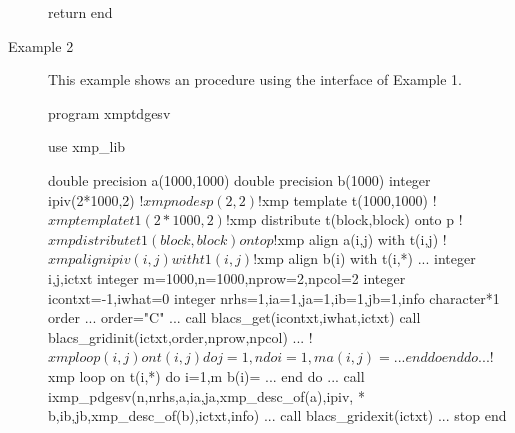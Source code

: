 \begin{description}
\begin{XFexample}
      return
      end

\end{XFexample}


\item[Example 2]
	   This example shows an {\XMP} procedure using the interface of
	   Example 1.

\begin{XFexample}
      program xmptdgesv

      use xmp_lib

      double precision a(1000,1000)
      double precision b(1000)
      integer ipiv(2*1000,2)
!$xmp nodes p(2,2)
!$xmp template t(1000,1000)
!$xmp template t1(2*1000,2)
!$xmp distribute t(block,block) onto p
!$xmp distribute t1(block,block) onto p
!$xmp align a(i,j) with t(i,j)
!$xmp align ipiv(i,j) with t1(i,j)
!$xmp align b(i) with t(i,*)
      ...
      integer i,j,ictxt
      integer m=1000,n=1000,nprow=2,npcol=2
      integer icontxt=-1,iwhat=0
      integer nrhs=1,ia=1,ja=1,ib=1,jb=1,info
      character*1 order
      ...
      order="C"
      ...
      call blacs_get(icontxt,iwhat,ictxt)
      call blacs_gridinit(ictxt,order,nprow,npcol)
      ...
!$xmp loop (i,j) on t(i,j)
      do j=1,n
         do i=1,m
            a(i,j) = ...
         end do
      end do
      ...
!$xmp loop on t(i,*)
      do i=1,m
         b(i)= ...
      end do
      ...
      call ixmp_pdgesv(n,nrhs,a,ia,ja,xmp_desc_of(a),ipiv,
     *                b,ib,jb,xmp_desc_of(b),ictxt,info)
      ...
      call blacs_gridexit(ictxt)
      ...
      stop
      end
\end{XFexample}
\end{description}
